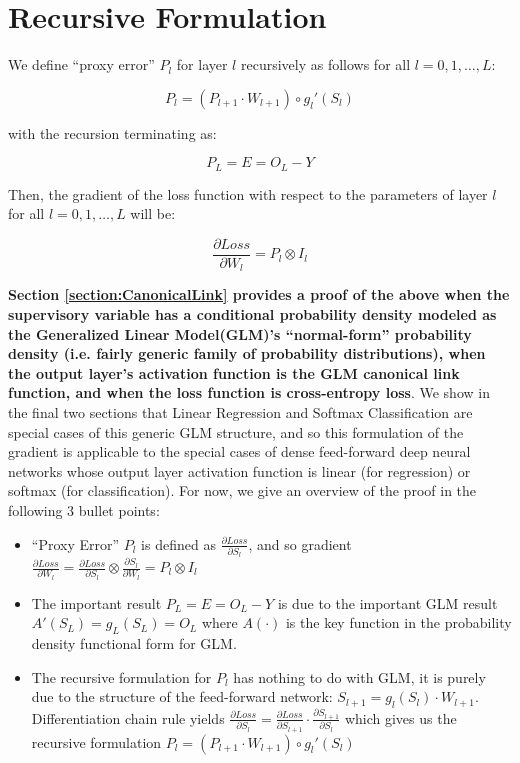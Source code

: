 \documentclass[10pt]{amsart}
\begin{document}
\section{Recursive Formulation}

We define ``proxy error'' $P_l$ for layer $l$ recursively as follows for all $l = 0, 1, \ldots, L$:

$$P_l = (P_{l+1} \cdot W_{l+1}) \circ g_l'(S_l)$$

with the recursion terminating as:

$$P_L = E = O_L - Y$$

Then, the gradient of the loss function with respect to the parameters of layer $l$ for all $l = 0, 1, \ldots, L$ will be:

$$ \frac {\partial Loss} {\partial W_l} = P_l \otimes I_l$$

{\bf Section \ref{section:CanonicalLink} provides a proof of the above when the supervisory variable has a conditional probability density modeled as the Generalized Linear Model(GLM)'s ``normal-form'' probability density (i.e. fairly generic family of probability distributions), when the output layer's activation function is the GLM canonical link function, and when the loss function is cross-entropy loss}. We show in the final two sections that Linear Regression and Softmax Classification are special cases of this generic GLM structure, and so this formulation of the gradient is applicable to the special cases of dense feed-forward deep neural networks whose output layer activation function is linear (for regression) or softmax (for classification). For now, we give an overview of the proof in the following 3 bullet points:

\begin{itemize}
\item ``Proxy Error'' $P_l$ is defined as $\frac {\partial Loss} {\partial S_l}$, and so gradient $\frac {\partial Loss} {\partial W_l} = \frac {\partial Loss}{\partial S_l} \otimes \frac {\partial S_l} {\partial W_l} = P_l \otimes I_l$
\item The important result $P_L = E = O_L - Y$ is due to the important GLM result $A'(S_L) = g_L(S_L) = O_L$ where $A(\cdot)$ is the key function in the probability density functional form for GLM.
\item The recursive formulation for $P_l$ has nothing to do with GLM, it is purely due to the structure of the feed-forward network: $S_{l+1} = g_l(S_l) \cdot W_{l+1}$. Differentiation chain rule yields $\frac {\partial Loss} {\partial S_l} = \frac {\partial Loss} {\partial S_{l+1}} \cdot \frac {\partial S_{l+1}} {\partial S_l}$ which gives us the recursive formulation $P_l = (P_{l+1} \cdot W_{l+1}) \circ g_l'(S_l)$
\end{itemize}
\end{document}
